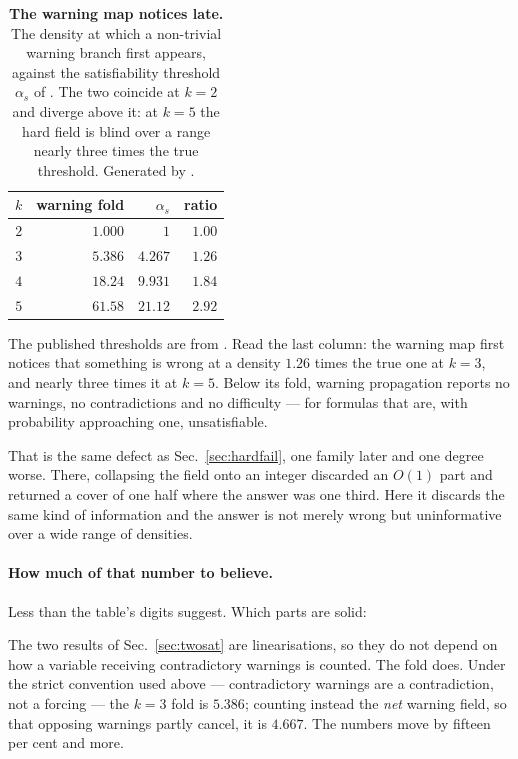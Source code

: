 \begin{table}[t]
\centering\small
\begin{tabular}{rrrr}
\hline\hline
$k$ & warning fold & $\alpha_{s}$ & ratio\\
\hline
$2$ & $1.000$ & $1$ & $1.00$\\
$3$ & $5.386$ & $4.267$ & $1.26$\\
$4$ & $18.24$ & $9.931$ & $1.84$\\
$5$ & $61.58$ & $21.12$ & $2.92$\\
\hline\hline
\end{tabular}
\caption{\textbf{The warning map notices late.} The density at which a non-trivial warning branch first appears, against the satisfiability threshold $\alpha_{s}$ of \citet{montanari2008}. The two coincide at $k=2$ and diverge above it: at $k=5$ the hard field is blind over a range nearly three times the true threshold. Generated by .}
\label{tab:satfold}
\end{table}

The published thresholds are from \citet{montanari2008}. Read the last
column: the warning map first notices that something is wrong at a density
$1.26$ times the true one at $k=3$, and nearly three times it at $k=5$. Below
its fold, warning propagation reports no warnings, no contradictions and no
difficulty --- for formulas that are, with probability approaching one,
unsatisfiable.

That is the same defect as Sec.~\ref{sec:hardfail}, one family later and one
degree worse. There, collapsing the field onto an integer discarded an $O(1)$
part and returned a cover of one half where the answer was one third. Here it
discards the same kind of information and the answer is not merely wrong but
uninformative over a wide range of densities.

\paragraph{How much of that number to believe.} Less than the table's digits
suggest. Which parts are solid:

The two results of Sec.~\ref{sec:twosat} are linearisations, so they do not
depend on how a variable receiving contradictory warnings is counted. The fold
does. Under the strict convention used above --- contradictory warnings are a
contradiction, not a forcing --- the $k=3$ fold is $5.386$; counting instead the
\emph{net} warning field, so that opposing warnings partly cancel, it is
$4.667$. The numbers move by fifteen per cent and more.

